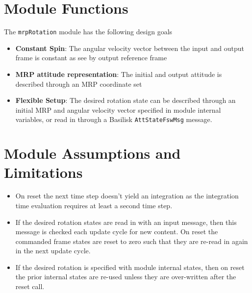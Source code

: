 

\section{Module Functions}
The {\tt mrpRotation} module has the following design goals
\begin{itemize}
	\item \textbf{Constant Spin}: The angular velocity vector between the input and output frame is constant as see by output reference frame
	\item \textbf{MRP attitude representation}: The initial and output attitude is described through an MRP coordinate set
	\item \textbf{Flexible Setup}:  The desired rotation state can be described through an initial MRP and angular velocity vector specified in module internal variables, or read in through a Basilisk {\tt AttStateFswMsg} message.
\end{itemize}

\section{Module Assumptions and Limitations}
\begin{itemize}
	\item On reset the  next time step doesn't yield an integration as the integration time evaluation requires at least a second time step.
	\item If the desired rotation states are read in with an input message, then this message is checked each update cycle for new content.   On reset the commanded frame states are reset to zero such that they are re-read in again in the next update cycle.
	\item If the desired rotation is specified with module internal states, then on reset the prior internal states are re-used unless they are over-written after the reset call.
\end{itemize}